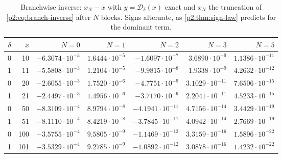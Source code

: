 \documentclass[11pt,a4paper,oneside]{book}
\theoremstyle{plain}
\theoremstyle{definition}
\theoremstyle{remark}
\begin{document}
\begin{table}[htbp]
\centering\small
\caption{Branchwise inverse: \(x_N-x\) with \(y=\mathcal D_\delta(x)\) exact
and \(x_N\) the truncation of \cref{p2:eq:branch-inverse} after \(N\) blocks.
Signs alternate, as \cref{p2:thm:sign-law} predicts for the dominant term.}
\label{p2:tab:inv}
\begin{tabular}{c r r r r r r}
\toprule
\(\delta\)&\(x\)&\(N=0\)&\(N=1\)&\(N=2\)&\(N=3\)&\(N=5\)\\
\midrule
0& 10 & \(-6.3074\cdot10^{-3}\) & \(1.6444\cdot10^{-5}\)
     & \(-1.6097\cdot10^{-7}\) & \(3.6890\cdot10^{-9}\)
     & \(1.1386\cdot10^{-11}\)\\
1& 11 & \(-5.5808\cdot10^{-3}\) & \(1.2104\cdot10^{-5}\)
     & \(-9.9815\cdot10^{-8}\) & \(1.9338\cdot10^{-9}\)
     & \(4.2632\cdot10^{-12}\)\\
0& 20 & \(-2.6055\cdot10^{-3}\) & \(1.7520\cdot10^{-6}\)
     & \(-4.7751\cdot10^{-9}\) & \(3.1029\cdot10^{-11}\)
     & \(7.6506\cdot10^{-15}\)\\
1& 21 & \(-2.4497\cdot10^{-3}\) & \(1.4956\cdot10^{-6}\)
     & \(-3.7170\cdot10^{-9}\) & \(2.2041\cdot10^{-11}\)
     & \(4.5233\cdot10^{-15}\)\\
0& 50 & \(-8.3109\cdot10^{-4}\) & \(8.9794\cdot10^{-8}\)
     & \(-4.1941\cdot10^{-11}\) & \(4.7156\cdot10^{-14}\)
     & \(3.4429\cdot10^{-19}\)\\
1& 51 & \(-8.1110\cdot10^{-4}\) & \(8.4219\cdot10^{-8}\)
     & \(-3.7845\cdot10^{-11}\) & \(4.0942\cdot10^{-14}\)
     & \(2.7669\cdot10^{-19}\)\\
0&100 & \(-3.5755\cdot10^{-4}\) & \(9.5805\cdot10^{-9}\)
     & \(-1.1469\cdot10^{-12}\) & \(3.3159\cdot10^{-16}\)
     & \(1.5896\cdot10^{-22}\)\\
1&101 & \(-3.5329\cdot10^{-4}\) & \(9.2785\cdot10^{-9}\)
     & \(-1.0892\cdot10^{-12}\) & \(3.0878\cdot10^{-16}\)
     & \(1.4232\cdot10^{-22}\)\\
\bottomrule
\end{tabular}
\end{table}
\end{document}
